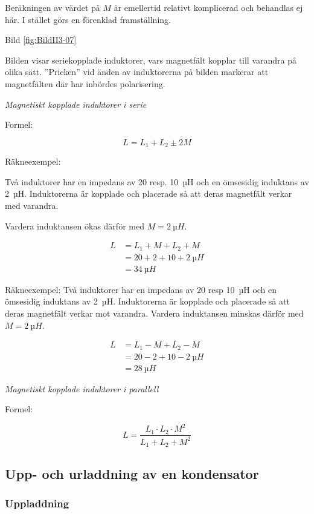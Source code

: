 Beräkningen av värdet på \(M\) är emellertid relativt komplicerad och behandlas
ej här. I stället görs en förenklad framställning.

Bild \ref{fig:BildII3-07}

Bilden visar seriekopplade induktorer, vars magnetfält kopplar till varandra på
olika sätt. ''Pricken'' vid änden av induktorerna på bilden markerar att
magnetfälten där har inbördes polarisering.

\emph{Magnetiskt kopplade induktorer i serie}

Formel:

\[L = L_1 +L_2 \pm 2M\]

Räkneexempel:

Två induktorer har en impedans av 20 resp. 10~µH och en ömsesidig induktans av
2~µH. Induktorerna är kopplade och placerade så att deras magnetfält verkar med
varandra.

Vardera induktansen ökas därför med \(M = 2\ µH\).

\begin{align*}
  L &= L_1 + M + L_2 + M \\
  &= 20 + 2 + 10 + 2\ µH \\
  &= 34\ µH
\end{align*}

Räkneexempel:
Två induktorer har en impedans av 20 resp 10~µH och en ömsesidig induktans av
2~µH. Induktorerna är kopplade och placerade så att deras magnetfält verkar mot
varandra. Vardera induktansen minskas därför med \(M = 2\ µH\).

\begin{align*}
  L &= L_1 - M + L_2 - M \\
  & = 20 - 2 + 10 - 2\ µH \\
  &= 28\ µH
\end{align*}

\emph{Magnetiskt kopplade induktorer i parallell}

Formel:

\[L = \frac{L_1 \cdot L_2 \cdot M^2}{L_1 + L_2 + M^2}\]

\subsection{Upp- och urladdning av en kondensator}

\subsubsection{Uppladdning}


